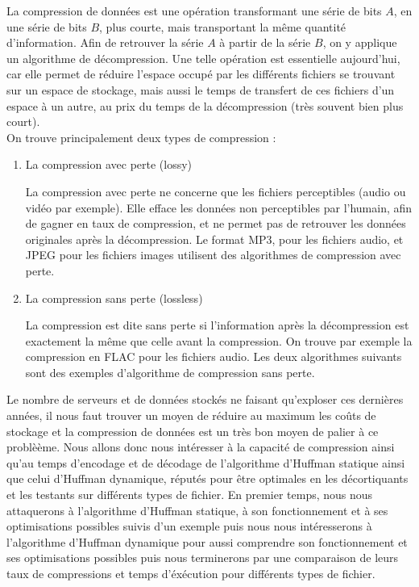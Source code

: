 \documentclass{article}
\begin{document}
La compression de donn\'ees est une op\'eration transformant une s\'erie de bits $A$, en une s\'erie de bits $B$, plus courte, mais transportant la m\^eme quantit\'e d'information. Afin de retrouver la s\'erie $A$ \`a partir de la s\'erie $B$, on y applique un algorithme de d\'ecompression.
Une telle op\'eration est essentielle aujourd'hui, car elle permet de r\'eduire l'espace occup\'e par les diff\'erents fichiers se trouvant sur un espace de stockage, mais aussi le temps de transfert de ces fichiers d'un espace \`a un autre, au prix du temps de la d\'ecompression (tr\`es souvent bien plus court). 
\\On trouve principalement deux types de compression :
\begin{enumerate}
\item La compression avec perte (lossy)

La compression avec perte ne concerne que les fichiers perceptibles (audio ou vid\'eo par exemple).
Elle efface les donn\'ees non perceptibles par l'humain, afin de gagner en taux de compression, et ne permet pas de retrouver les donn\'ees originales apr\`es la d\'ecompression. Le format MP3, pour les fichiers audio, et JPEG pour les fichiers images utilisent des algorithmes de compression avec perte.

\item La compression sans perte (lossless)

La compression est dite sans perte si l'information apr\`es la d\'ecompression est exactement la m\^eme que celle avant la compression. On trouve par exemple la compression en FLAC pour les fichiers audio. Les deux algorithmes suivants sont des exemples d'algorithme de compression sans perte.

\end{enumerate}

Le nombre de serveurs et de donn\'ees stock\'es ne faisant qu'exploser ces derni\`eres ann\'ees, il nous faut trouver un moyen de r\'eduire au maximum les co\^uts de stockage et la compression de donn\'ees est un tr\`es bon moyen de palier à ce problè\`eme.
Nous allons donc nous int\'eresser \`a la capacit\'e de compression ainsi qu'au temps d'encodage et de d\'ecodage de l'algorithme d'Huffman statique ainsi que celui d'Huffman dynamique, r\'eput\'es pour \^etre optimales en les d\'ecortiquants et les testants sur diff\'erents types de fichier.
En premier temps, nous nous attaquerons à l'algorithme d'Huffman statique, à son fonctionnement et à ses optimisations possibles suivis d'un exemple puis nous nous int\'eresserons à l'algorithme d'Huffman dynamique pour aussi comprendre son fonctionnement et ses optimisations possibles puis nous 
terminerons par une comparaison de leurs taux de compressions et temps d'\'ex\'ecution pour diff\'erents types de fichier.
\end{document}
